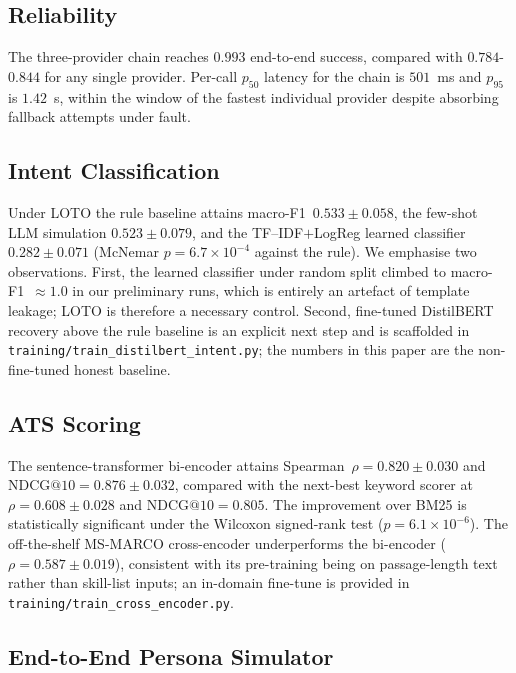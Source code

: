 \documentclass[conference]{IEEEtran}
\begin{document}
\subsection{Reliability}


The three-provider chain reaches $0.993$ end-to-end success, compared
with $0.784$-$0.844$ for any single provider. Per-call $p_{50}$ latency
for the chain is $501$~ms and $p_{95}$ is $1.42$~s, within the window of
the fastest individual provider despite absorbing fallback attempts
under fault.

\subsection{Intent Classification}


Under LOTO the rule baseline attains macro-F1~$0.533\pm0.058$, the
few-shot LLM simulation $0.523\pm0.079$, and the TF--IDF$+$LogReg
learned classifier $0.282\pm0.071$ (McNemar $p=6.7\!\times\!10^{-4}$
against the rule). We emphasise two observations. First, the learned
classifier under random split climbed to macro-F1~$\approx 1.0$ in our
preliminary runs, which is entirely an artefact of template leakage;
LOTO is therefore a necessary control. Second, fine-tuned DistilBERT
recovery above the rule baseline is an explicit next step and is
scaffolded in \texttt{training/train\_distilbert\_intent.py}; the
numbers in this paper are the non-fine-tuned honest baseline.

\subsection{ATS Scoring}


The sentence-transformer bi-encoder attains
Spearman~$\rho=0.820\pm0.030$ and NDCG$@10=0.876\pm0.032$, compared with
the next-best keyword scorer at $\rho=0.608\pm0.028$ and
NDCG$@10=0.805$. The improvement over BM25 is statistically significant
under the Wilcoxon signed-rank test ($p=6.1\!\times\!10^{-6}$). The
off-the-shelf MS-MARCO cross-encoder underperforms the bi-encoder
($\rho=0.587\pm0.019$), consistent with its pre-training being on
passage-length text rather than skill-list inputs; an in-domain
fine-tune is provided in
\texttt{training/train\_cross\_encoder.py}.

\subsection{End-to-End Persona Simulator}

\end{document}
